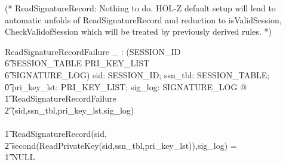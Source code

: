 \documentclass[a4paper,pdftex]{article}
\newenvironment{holz-proof}{\comment}{\endcomment}
\begin{document}
\begin{holz-proof}
(* ReadSignatureRecord: Nothing to do.
   HOL-Z default setup will lead to automatic unfolds
   of ReadSignatureRecord and reduction to isValidSession, 
   CheckValidofSession
   which will be treated by previously derived rules. *)
\end{holz-proof}


\begin{axdef}
ReadSignatureRecordFailure \_ : \power (SESSION\_ID \cross\\
\t6                                      SESSION\_TABLE \cross  PRI\_KEY\_LIST \cross \\
\t6                                      SIGNATURE\_LOG)
\where
\forall sid: SESSION\_ID; ssn\_tbl: SESSION\_TABLE; \\
\t0 pri\_key\_lst: PRI\_KEY\_LIST; sig\_log: SIGNATURE\_LOG @ \\
\t1 ReadSignatureRecordFailure\\
\t2    (sid,ssn\_tbl,pri\_key\_lst,sig\_log)\\
 \iff \\
\t1 ReadSignatureRecord(sid, \\
\t2    second(ReadPrivateKey(sid,ssn\_tbl,pri\_key\_lst)),sig\_log) = \\
\t1 NULL
\end{axdef}
\end{document}
